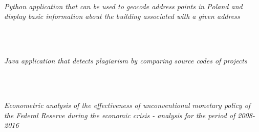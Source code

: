 \documentclass{cls/gml_cv_sets}
\begin{document}
\begin{paracol}{2}
{{ 
  \\

  \\ \vspace{0.6em}

 \\ 

\textit{\footnotesize Python application that can be used to geocode address 
points in Poland and display basic information about the building associated 
with a given address} \\ \vspace{-0.75em}

 \\ \vspace{0.6em}

 \\ 

\textit{\footnotesize Java application that detects plagiarism by comparing 
source codes of projects} \\ \vspace{-0.75em}

 \\ \vspace{0.6em}

 \\ 

\textit{\footnotesize Econometric analysis of the effectiveness of 
unconventional monetary policy of the Federal Reserve during the economic 
crisis - analysis for the period of 2008-2016} \\ \vspace{-0.75em}

 \\ \vspace{0.6em}

}}
\end{paracol}
\end{document}
